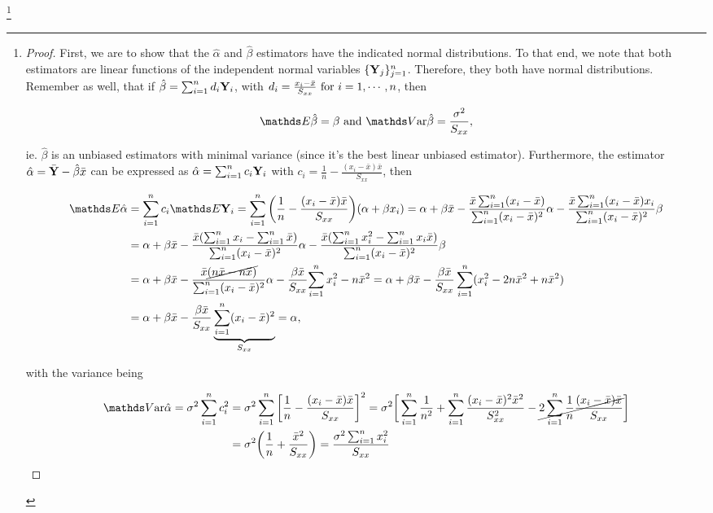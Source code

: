 \documentclass{homework}
\begin{document}
\begin{theo}
\label{linear model distributions}\footnote{\begin{proof}
First, we are to show that the $\hat{\alpha}$ and $\hat{\beta}$ estimators have the indicated normal distributions. To that end, we note that both estimators are linear functions of the independent normal variables $\{{\bf Y}_j\}_{j=1}^{n}$. Therefore, they both have normal distributions. Remember as well, that if $\hat{\beta} = \sum_{i=1}^{n} d_i {\bf Y}_i$, with $d_i = \frac{x_i - \bar{x}}{S_{xx}} \textnormal{ for } i = 1, \cdots, n$, then 

$$
\E \hat{\beta} = \beta \textnormal{ and } \var \hat{\beta} = \frac{\sigma^2}{S_{xx}},
$$

ie. $\hat{\beta}$ is an unbiased estimators with minimal variance (since it's the best linear unbiased estimator). Furthermore, the estimator $\hat{\alpha} = \bar{{\bf Y}} - \hat{\beta} \bar{x}$ can be expressed as $\hat{\alpha} = \sum_{i=1}^{n} c_i {\bf Y}_i$ with $c_i = \frac{1}{n} - \frac{(x_i - \bar{x})\bar{x}}{S_{xx}}$, then 

\begin{align*}
    \E \hat{\alpha} &= \summation c_i \E \Y_i = \summation \bigg(\frac{1}{n}-\frac{(x_i-\bar{x})\bar{x}}{S_{xx}}\bigg) (\alpha + \beta x_i) = \alpha + \beta \bar{x} - \frac{\bar x \summation(x_i - \bar x)}{\summation (x_i - \bar{x})^2} \alpha - \frac{\bar x \summation(x_i - \bar x) x_i}{\summation (x_i - \bar{x})^2} \beta \\
    &= \alpha + \beta \bar{x} - \frac{\bar x(\summation x_i -  \summation \bar x)}{\summation (x_i - \bar{x})^2} \alpha - \frac{\bar x (\summation x_i^2 -  \summation x_i\bar x) }{\summation (x_i - \bar{x})^2} \beta \\
    &= \alpha + {\beta \bar{x}} - \frac{\bar x \cancel{(n \bar x -  n\bar x)}}{\summation (x_i - \bar{x})^2} \alpha - \frac{\beta \bar x}{S_{xx}} {\summation x_i^2 - n\bar{x}^2} = \alpha + {\beta \bar{x}} - \frac{\beta \bar{x}}{S_{xx}} \summation(x_i^2 -2n \bar{x}^2 + n \bar{x}^2) \\
    &= \alpha + {\beta \bar{x}} - \frac{\beta \bar{x}}{S_{xx}} \underbrace{\summation(x_i - \bar x)^2}_{S_{xx}} = \alpha,
\end{align*}

with the variance being 

\begin{align*}
    \var \hat \alpha = \sigma^2 \summation c_i^2 &= \sigma^2 \summation \bigg[\frac{1}{n}-\frac{(x_i-\bar{x})\bar{x}}{S_{xx}}\bigg]^2 = \sigma^2 \bigg[ \summation \frac{1}{n^2} + \summation \frac{(x_i-\bar{x})^2\bar{x}^2}{S_{xx}^2} - \cancel{2 \summation \frac{1}{n} \frac{(x_i-\bar{x})\bar{x}}{S_{xx}}} \bigg]\\
    &= \sigma^2 \bigg( \frac{1}{n} + \frac{\bar{x}^2}{S_{xx}} \bigg) = \frac{\sigma^2 \summation x_i^2}{S_{xx}}
\end{align*}


\end{proof}}
\end{theo}
\end{document}
